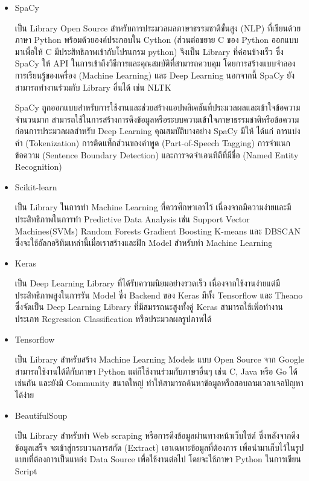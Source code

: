 \documentclass[12pt,oneside,openright,a4paper]{cpe-thai-project}
\begin{document}
\begin{itemize}
      \item SpaCy
      
      \hspace{1cm}เป็น Library Open Source สำหรับการประมวลผลภาษาธรรมชาติขั้นสูง (NLP) 
      ที่เขียนด้วยภาษา Python พร้อมด้วยองค์ประกอบใน Cython (ส่วนต่อขยาย C ของ Python ออกแบบมาเพื่อให้ C มีประสิทธิภาพเข้ากับโปรแกรม python) 
      จึงเป็น Library ที่ค่อนข้างเร็ว ซึ่ง SpaCy ให้ API ในการเข้าถึงวิธีการและคุณสมบัติที่สามารถควบคุม โดยการสร้างแบบจำลองการเรียนรู้ของเครื่อง (Machine Learning) และ Deep Learning
      นอกจากนี้ SpaCy ยังสามารถทำงานร่วมกับ Library อื่นได้ เช่น NLTK
      
      \hspace{1cm}SpaCy ถูกออกแบบสำหรับการใช้งานและช่วยสร้างแอปพลิเคชันที่ประมวลผลและเข้าใจข้อความจำนวนมาก 
      สามารถใช้ในการสร้างการดึงข้อมูลหรือระบบความเข้าใจภาษาธรรมชาติหรือข้อความก่อนการประมวลผลสำหรับ Deep Learning 
      คุณสมบัติบางอย่าง SpaCy มีให้ ได้แก่ การแบ่งคำ (Tokenization) การติดแท็กส่วนของคำพูด (Part-of-Speech Tagging)
      การจำแนกข้อความ (Sentence Boundary Detection) และการจดจำเอนทิตีที่มีชื่อ (Named Entity Recognition) \cite{spacy}
      
      \item Scikit-learn
      
      \hspace{1cm}เป็น Library ในการทำ Machine Learning ที่ควรศึกษาเอาไว้ เนื่องจากมีความง่ายและมีประสิทธิภาพในการทำ Predictive Data Analysis 
      เช่น Support Vector Machines(SVMs) Random Forests Gradient Boosting K-means และ DBSCAN 
      ซึ่งจะใช้อัลกอริทึมเหล่านี้เมื่อเราสร้างและฝึก Model สำหรับทำ Machine Learning \cite{pylib}
      
      \item Keras
      
      \hspace{1cm}เป็น Deep Learning Library ที่ได้รับความนิยมอย่างรวดเร็ว เนื่องจากใช้งานง่ายแต่มีประสิทธิภาพสูงในการรัน Model 
      ซึ่ง Backend ของ Keras มีทั้ง Tensorflow และ Theano ซึ่งจัดเป็น Deep Learning Library ที่มีสมรรถนะสูงทั้งคู่
      Keras สามารถใช้เพิ่อทำงานประเภท Regression Classification หรือประมวลผลรูปภาพได้ \cite{pylib}
      
      \item Tensorflow
      
      \hspace{1cm}เป็น Library สำหรับสร้าง Machine Learning Models แบบ Open Source จาก Google สามารถใช้งานได้ดีกับภาษา Python 
      แต่ก็ใช้งานร่วมกับภาษาอื่นๆ เช่น C, Java หรือ Go ได้เช่นกัน และยังมี Community ขนาดใหญ่ ทำให้สามารถค้นหาข้อมูลหรือสอบถามเวลาเจอปัญหาได้ง่าย \cite{pylib}

      \item BeautifulSoup

        \hspace{1cm}เป็น Library สำหรับทำ Web scraping หรือการดึงข้อมูลผ่านทางหน้าเว็บไซต์ ซึ่งหลังจากดึงข้อมูลเสร็จ จะเข้าสู่กระบวนการสกัด (Extract) 
        เอาเฉพาะข้อมูลที่ต้องการ เพื่อนำมาเก็บไว้ในรูปแบบที่ต้องการเป็นแหล่ง Data Source เพื่อใช้งานต่อไป โดยจะใช้ภาษา Python ในการเขียน Script \cite{beautifulsoup}
    \end{itemize}
\end{document}

